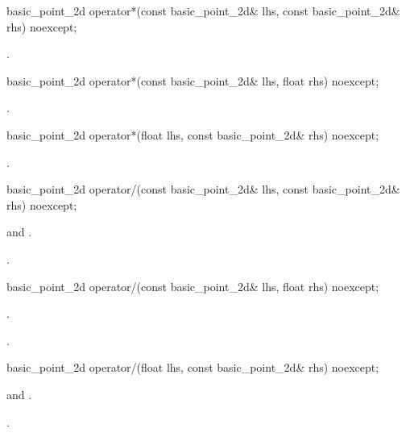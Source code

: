 %
\begin{itemdecl}
basic_point_2d operator*(const basic_point_2d& lhs, const basic_point_2d& rhs) noexcept;
\end{itemdecl}
\begin{itemdescr}
\pnum
\returns
{}.
\end{itemdescr}

%
\begin{itemdecl}
basic_point_2d operator*(const basic_point_2d& lhs, float rhs) noexcept;
\end{itemdecl}
\begin{itemdescr}
\pnum
\returns
{}.
\end{itemdescr}

%
\begin{itemdecl}
basic_point_2d operator*(float lhs, const basic_point_2d& rhs) noexcept;
\end{itemdecl}
\begin{itemdescr}
\pnum
\returns
{}.
\end{itemdescr}

%
\begin{itemdecl}
basic_point_2d operator/(const basic_point_2d& lhs, const basic_point_2d& rhs) noexcept;
\end{itemdecl}
\begin{itemdescr}
\pnum
\requires {} and .

\pnum
\returns
{}.
\end{itemdescr}

%
\begin{itemdecl}
basic_point_2d operator/(const basic_point_2d& lhs, float rhs) noexcept;
\end{itemdecl}
\begin{itemdescr}
\pnum
\requires
{}.

\pnum
\returns
{}.
\end{itemdescr}

%
\begin{itemdecl}
basic_point_2d operator/(float lhs, const basic_point_2d& rhs) noexcept;
\end{itemdecl}
\begin{itemdescr}
\pnum
\requires
{} and .

\pnum
\returns
{}.
\end{itemdescr}
